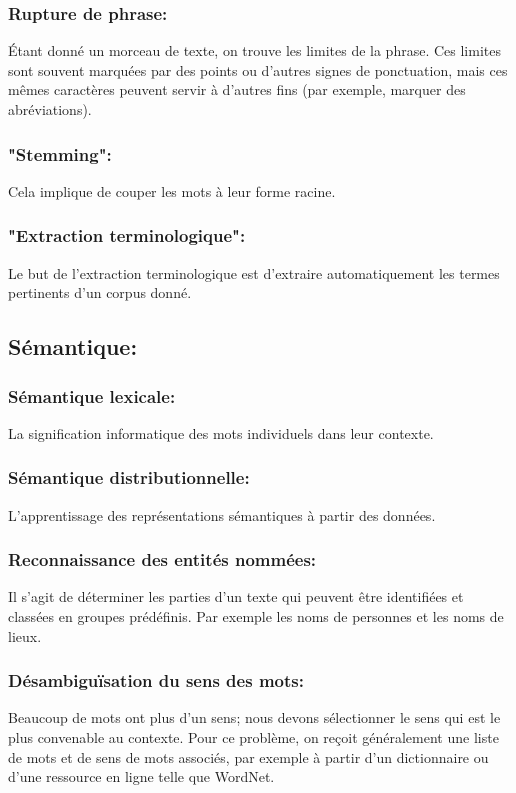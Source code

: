 \subsubsection{Rupture de phrase:}
Étant donné un morceau de texte, on trouve les limites de la phrase. Ces limites sont souvent marquées par des points ou d'autres signes de ponctuation, mais ces mêmes caractères peuvent servir à d'autres fins (par exemple, marquer des abréviations).
\subsubsection{"Stemming":}
Cela implique de couper les mots à leur forme racine.
\subsubsection{"Extraction terminologique":}
Le but de l'extraction terminologique est d'extraire automatiquement les termes pertinents d'un corpus donné.

\subsection{Sémantique:}
\subsubsection{Sémantique lexicale:}
La signification informatique des mots individuels dans leur contexte.
\subsubsection{Sémantique distributionnelle:}
L'apprentissage des représentations sémantiques à partir des données.
\subsubsection{Reconnaissance des entités nommées:}
Il s'agit de déterminer les parties d'un texte qui peuvent être identifiées et classées en groupes prédéfinis. Par exemple les noms de personnes et les noms de lieux.
\subsubsection{Désambiguïsation du sens des mots:}
Beaucoup de mots ont plus d'un sens; nous devons sélectionner le sens qui est le plus convenable au contexte. Pour ce problème, on reçoit généralement une liste de mots et de sens de mots associés, par exemple à partir d'un dictionnaire ou d'une ressource en ligne telle que WordNet.
